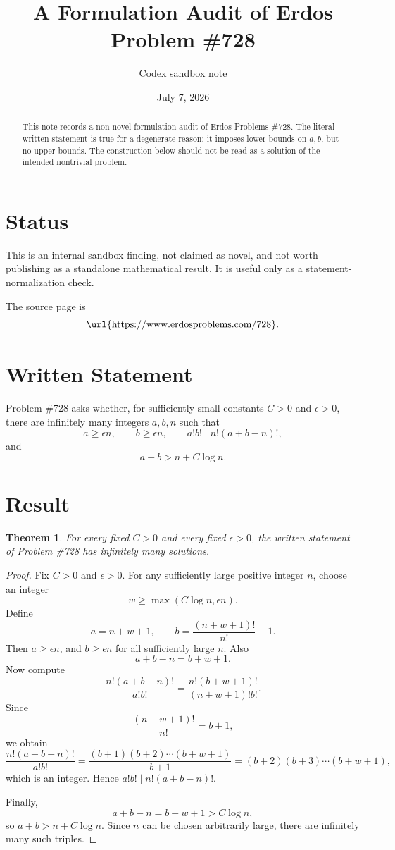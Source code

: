 \documentclass[11pt]{article}
\title{A Formulation Audit of Erdos Problem \#728}
\author{Codex sandbox note}
\date{July 7, 2026}
\newtheorem*{theorem}{Theorem}
\begin{document}
\maketitle

\begin{abstract}
This note records a non-novel formulation audit of Erdos Problems \#728.
The literal written statement is true for a degenerate reason: it imposes
lower bounds on \(a,b\), but no upper bounds. The construction below should
not be read as a solution of the intended nontrivial problem.
\end{abstract}

\section*{Status}

This is an internal sandbox finding, not claimed as novel, and not worth
publishing as a standalone mathematical result. It is useful only as a
statement-normalization check.

The source page is
\[
\text{\url{https://www.erdosproblems.com/728}}.
\]

\section*{Written Statement}

Problem \#728 asks whether, for sufficiently small constants \(C>0\) and
\(\epsilon>0\), there are infinitely many integers \(a,b,n\) such that
\[
a\geq \epsilon n,\qquad b\geq \epsilon n,\qquad
a!b!\mid n!(a+b-n)!,
\]
and
\[
a+b>n+C\log n.
\]

\section*{Result}

\begin{theorem}
For every fixed \(C>0\) and every fixed \(\epsilon>0\), the written
statement of Problem \#728 has infinitely many solutions.
\end{theorem}

\begin{proof}
Fix \(C>0\) and \(\epsilon>0\). For any sufficiently large positive integer
\(n\), choose an integer
\[
w\geq \max(C\log n,\epsilon n).
\]
Define
\[
a=n+w+1,\qquad b=\frac{(n+w+1)!}{n!}-1.
\]
Then \(a\geq \epsilon n\), and \(b\geq \epsilon n\) for all sufficiently large
\(n\). Also
\[
a+b-n=b+w+1.
\]
Now compute
\[
\frac{n!(a+b-n)!}{a!b!}
=
\frac{n!(b+w+1)!}{(n+w+1)!b!}.
\]
Since
\[
\frac{(n+w+1)!}{n!}=b+1,
\]
we obtain
\[
\frac{n!(a+b-n)!}{a!b!}
=
\frac{(b+1)(b+2)\cdots(b+w+1)}{b+1}
=(b+2)(b+3)\cdots(b+w+1),
\]
which is an integer. Hence \(a!b!\mid n!(a+b-n)!\).

Finally,
\[
a+b-n=b+w+1>C\log n,
\]
so \(a+b>n+C\log n\). Since \(n\) can be chosen arbitrarily large, there
are infinitely many such triples.
\end{proof}
\end{document}
